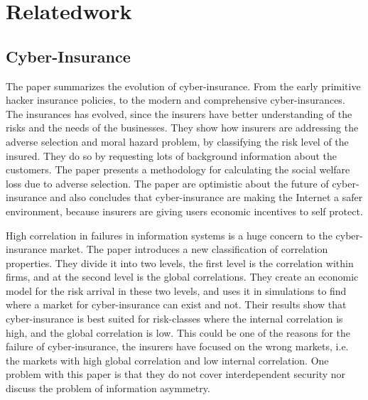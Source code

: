 \chapter{Relatedwork}
\label{chp:relatedwork} 



\section{Cyber-Insurance}

The paper \cite{majuca2006evolution} summarizes the evolution of cyber-insurance. From the early primitive hacker insurance policies, to the modern and comprehensive cyber-insurances. The insurances has evolved, since the insurers have better understanding of the risks and the needs of the businesses. They show how insurers are addressing the adverse selection and moral hazard problem, by classifying the risk level of the insured. They do so by requesting lots of background information about the customers. The paper presents a methodology for calculating the social welfare loss due to adverse selection. The paper are optimistic about the future of cyber-insurance and also concludes that cyber-insurance are making the Internet a safer environment, because insurers are giving users economic incentives to self protect. 

High correlation in failures in information systems is a huge concern to the cyber-insurance market. The paper \cite{bohme2006models} introduces a new classification of correlation properties. They divide it into two levels, the first level is the correlation within firms, and at the second level is the global correlations. They create an economic model for the risk arrival in these two levels, and uses it in simulations to find where a market for cyber-insurance can exist and not. Their results show that cyber-insurance is best suited for risk-classes where the internal correlation is high, and the global correlation is low. This could be one of the reasons for the failure of cyber-insurance, the insurers have focused on the wrong markets, i.e. the markets with high global correlation and low internal correlation. One problem with this paper is that they do not cover interdependent security nor discuss the problem of information asymmetry.  

